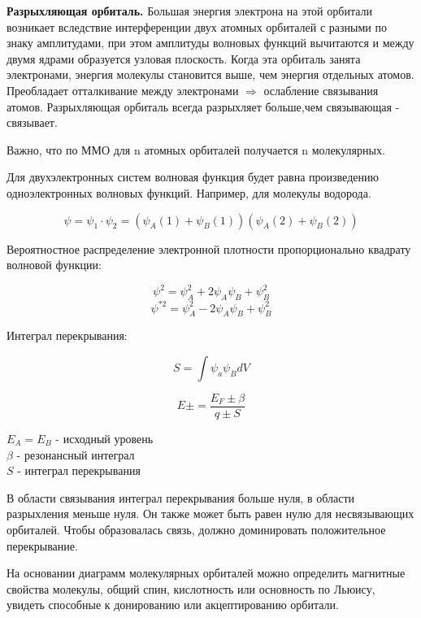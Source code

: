 \textbf{Разрыхляющая орбиталь.} Большая энергия электрона на этой орбитали возникает
вследствие интерференции двух атомных орбиталей с разными по знаку амплитудами, при
этом амплитуды волновых функций вычитаются и между двумя ядрами образуется узловая
плоскость. Когда эта орбиталь занята электронами, энергия молекулы становится выше,
чем энергия отдельных атомов. Преобладает отталкивание между электронами $\Rightarrow$ 
ослабление связывания атомов. Разрыхляющая орбиталь всегда разрыхляет больше,чем
связывающая - связывает.

Важно, что по ММО для n атомных орбиталей получается n
молекулярных.

Для двухэлектронных систем волновая функция будет равна
произведению одноэлектронных волновых функций. Например,
для молекулы водорода.

$$\psi = \psi_1\cdot\psi_2 = (\psi_A(1)+\psi_B(1))(\psi_A(2)+\psi_B(2))$$

Вероятностное распределение электронной плотности пропорционально квадрату волновой функции:

$$\psi^2 = \psi_A^2 + 2\psi_A\psi_B + \psi_B^2$$
$$\psi^{*2} = \psi_A^2 - 2\psi_A\psi_B + \psi_B^2$$

Интеграл перекрывания:

$$S = \int\psi_a\psi_BdV$$

$$E\pm = \frac{E_F\pm\beta}{q\pm S}$$

$E_A = E_B$ - исходный уровень\\
$\beta$ - резонансный интеграл\\
$S$ - интеграл перекрывания

В области связывания интеграл перекрывания больше нуля, в
области разрыхления меньше нуля. Он также может быть равен
нулю для несвязывающих орбиталей. Чтобы образовалась связь,
должно доминировать положительное перекрывание.

На основании диаграмм молекулярных орбиталей можно
определить магнитные свойства молекулы, общий спин,
кислотность или основность по Льюису, увидеть способные к
донированию или акцептированию орбитали.